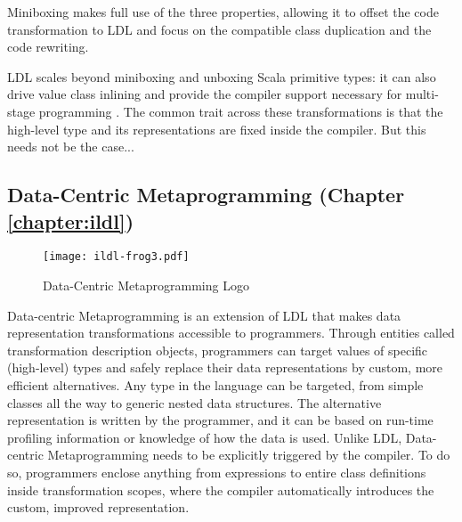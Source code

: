 Miniboxing makes full use of the three properties, allowing it to offset the code transformation to LDL and focus on the compatible class duplication and the code rewriting.

LDL scales beyond miniboxing and unboxing Scala primitive types: it can also drive value class inlining \cite{gosling-value-classes,rose-value-classes-tearing,rose-value-classes-vm} and provide the compiler support necessary for multi-stage programming \cite{tiark-lms, scala-virtualized}. The common trait across these transformations is that the high-level type and its representations are fixed inside the compiler. But this needs not be the case...

%
%
%
%

\subsection{Data-Centric Metaprogramming (Chapter \ref{chapter:ildl})}

\begin{wrapfigure}{r}{40mm}
  \centering
  \vspace{-2em}
  \texttt{[image: ildl-frog3.pdf]}
  \vspace{-1em}
  \caption{Data-Centric Metaprogramming Logo}
  \vspace{-2em}
\end{wrapfigure}


Data-centric Metaprogramming is an extension of LDL that makes data representation transformations accessible to programmers. Through entities called transformation description objects, programmers can target values of specific (high-level) types and safely replace their data representations by custom, more efficient alternatives. Any type in the language can be targeted, from simple classes all the way to generic nested data structures. The alternative representation is written by the programmer, and it can be based on run-time profiling information or knowledge of how the data is used. Unlike LDL, Data-centric Metaprogramming needs to be explicitly triggered by the compiler. To do so,  programmers enclose anything from expressions to entire class definitions inside transformation scopes, where the compiler automatically introduces the custom, improved representation.

